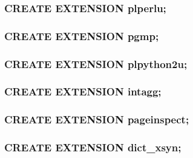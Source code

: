 \documentclass[utf8,hyperref={pdftex,colorlinks,linkcolor=black,citecolor=black,urlcolor=black,filecolor=black,plainpages=false},xcolor=table,hyperref]{beamer}
\begin{document}
\begin{frame}[containsverbatim]
	\frametitle{CREATE EXTENSION plperlu;}
\end{frame}

\begin{frame}[containsverbatim]
	\frametitle{CREATE EXTENSION pgmp;}
\end{frame}

\begin{frame}[containsverbatim]
	\frametitle{CREATE EXTENSION plpython2u;}
\end{frame}

\begin{frame}[containsverbatim]
	\frametitle{CREATE EXTENSION intagg;}
\end{frame}

\begin{frame}[containsverbatim]
	\frametitle{CREATE EXTENSION pageinspect;}
\end{frame}

\begin{frame}[containsverbatim]
	\frametitle{CREATE EXTENSION dict_xsyn;}
\end{frame}
\end{document}
